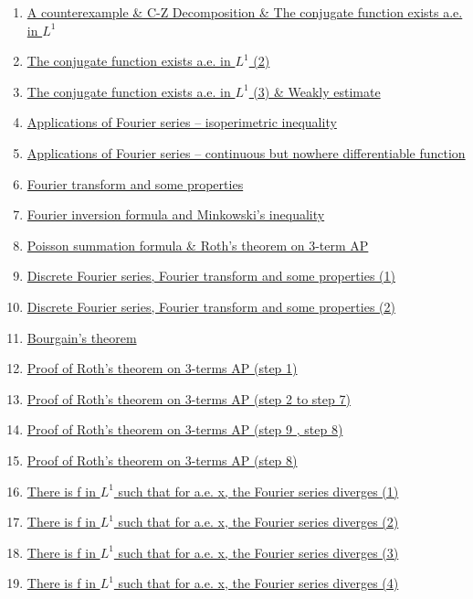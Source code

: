 \documentclass[11pt]{article}
\begin{document}
\begin{enumerate}
	\item 	\href{https://mp.weixin.qq.com/s/Zx1xLGXJ1we4dVDY_Zt0tg}{A counterexample \& C-Z Decomposition \& The conjugate function exists a.e. in $L^1$}	%
	\item	\href{https://mp.weixin.qq.com/s/Yo5DnLRpAZ0Yz2J-riK8Nw}{The conjugate function exists a.e. in $L^1$ (2)}	%
	\item	\href{https://mp.weixin.qq.com/s/8zYuUi7SjpPN64m08FL9PA}{The conjugate function exists a.e. in $L^1$ (3) \& Weakly estimate}	%
	\item	\href{https://mp.weixin.qq.com/s/iIWy0J2VjjtLPdH1Xtpw2A}{Applications of Fourier series – isoperimetric inequality} 	%
	\item 	\href{https://mp.weixin.qq.com/s/zFWDaC4RMTNcZMaEoUb7Iw}{Applications of Fourier series – continuous but nowhere differentiable function}	%
	\item 	\href{https://mp.weixin.qq.com/s/vafsXLbIouwEudCbt6gzhA}{Fourier transform and some properties}	%
	\item 	\href{https://mp.weixin.qq.com/s/hBs4ElZa2V95lLbnyi3qNg}{Fourier inversion formula and Minkowski's inequality}	%
	\item 	\href{https://mp.weixin.qq.com/s/JZXYVWcqn5tfjxecIPsyEA}{Poisson summation formula \& Roth's theorem on 3-term AP}	%
	\item 	\href{https://mp.weixin.qq.com/s/HKBxFlChuJpQPru7-EUPMA}{Discrete Fourier series, Fourier transform and some properties (1)}	%
	\item 	\href{https://mp.weixin.qq.com/s/dbqjLczJmPPk2UCY1gu5uA}{Discrete Fourier series, Fourier transform and some properties (2)}	%
	\item 	\href{https://mp.weixin.qq.com/s/-CJqt4TfShm67tdGhtJIQA}{Bourgain's theorem}	%
	\item	\href{https://mp.weixin.qq.com/s/m7KBS-pxKYPkdu2C5qcaYA}{Proof of Roth's theorem on 3-terms AP (step 1)}	%
	\item	\href{https://mp.weixin.qq.com/s/YQKnyXQFBdJaGGZW8PIYyA}{Proof of Roth's theorem on 3-terms AP (step 2 to step 7)}	%
	\item	\href{https://mp.weixin.qq.com/s/uNtqocYMHuEJGnJACyzCCA}{Proof of Roth's theorem on 3-terms AP (step 9 , step 8)} 	%
	\item 	\href{https://mp.weixin.qq.com/s/F09dwuDWQZo2icfUVU5n8g}{Proof of Roth's theorem on 3-terms AP (step 8)}	%
	\item 	\href{https://mp.weixin.qq.com/s/ZxVYVBl_wdy62OSQnh5djg}{There is f in $L^1$ such that for a.e. x, the Fourier series diverges (1)}	%
	\item 	\href{https://mp.weixin.qq.com/s/5yJ6R74prvfVDOLL7xMUUw}{There is f in $L^1$ such that for a.e. x, the Fourier series diverges (2)}	%
	\item 	\href{https://mp.weixin.qq.com/s/dvcfJ95Gof7rCDUlMr_YDw}{There is f in $L^1$ such that for a.e. x, the Fourier series diverges (3)}	%
	\item 	\href{https://mp.weixin.qq.com/s/6lLfQ3tq_BGrOEXlW60uUA}{There is f in $L^1$ such that for a.e. x, the Fourier series diverges (4)}	%
\end{enumerate}
\end{document}

